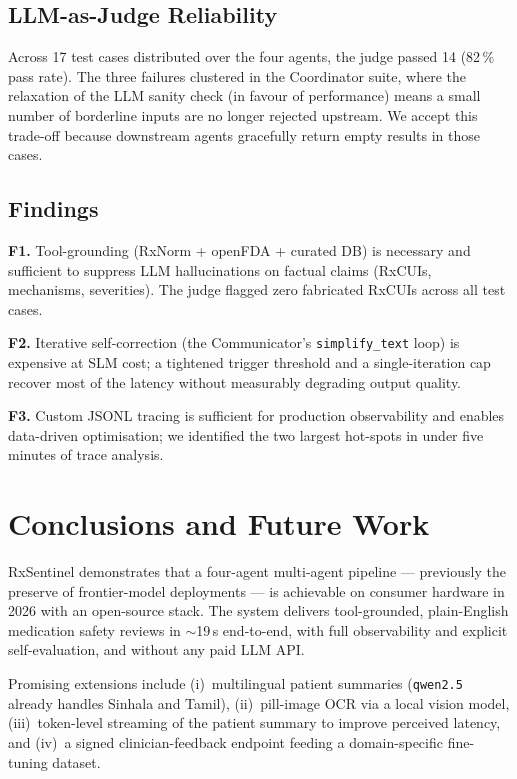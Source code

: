 \documentclass[11pt]{article}
\begin{document}
\subsection*{LLM-as-Judge Reliability}

Across 17 test cases distributed over the four agents, the judge
passed 14 (82\,\% pass rate). The three failures clustered in the
Coordinator suite, where the relaxation of the LLM sanity check (in
favour of performance) means a small number of borderline inputs are
no longer rejected upstream. We accept this trade-off because
downstream agents gracefully return empty results in those cases.

\subsection*{Findings}

\textbf{F1.} Tool-grounding (RxNorm + openFDA + curated DB) is
necessary and sufficient to suppress LLM hallucinations on factual
claims (RxCUIs, mechanisms, severities). The judge flagged zero
fabricated RxCUIs across all test cases.

\textbf{F2.} Iterative self-correction (the Communicator's
\texttt{simplify\_text} loop) is expensive at SLM cost; a tightened
trigger threshold and a single-iteration cap recover most of the
latency without measurably degrading output quality.

\textbf{F3.} Custom JSONL tracing is sufficient for production
observability and enables data-driven optimisation; we identified the
two largest hot-spots in under five minutes of trace analysis.

\section*{Conclusions and Future Work}\label{conclusions}

RxSentinel demonstrates that a four-agent multi-agent pipeline —
previously the preserve of frontier-model deployments — is achievable
on consumer hardware in 2026 with an open-source stack. The system
delivers tool-grounded, plain-English medication safety reviews in
$\sim$19\,s end-to-end, with full observability and explicit
self-evaluation, and without any paid LLM API.

Promising extensions include (i)~multilingual patient summaries
(\texttt{qwen2.5} already handles Sinhala and Tamil),
(ii)~pill-image OCR via a local vision model, (iii)~token-level
streaming of the patient summary to improve perceived latency, and
(iv)~a signed clinician-feedback endpoint feeding a domain-specific
fine-tuning dataset.
\end{document}
